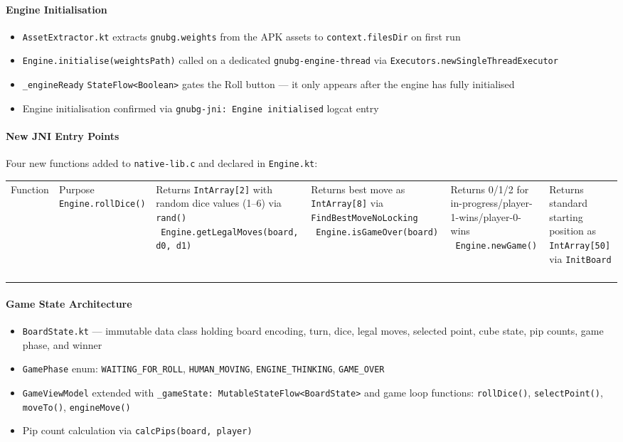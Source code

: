 \documentclass[11pt,a4paper]{article}
\providecommand{\tightlist}{\setlength{\itemsep}{2pt}\setlength{\parskip}{0pt}}
\begin{document}
\paragraph{Engine Initialisation}\label{engine-init-v093}

\begin{itemize}
\tightlist
\item
  \texttt{AssetExtractor.kt} extracts \texttt{gnubg.weights} from the
  APK assets to \texttt{context.filesDir} on first run
\item
  \texttt{Engine.initialise(weightsPath)} called on a dedicated
  \texttt{gnubg-engine-thread} via \texttt{Executors.newSingleThreadExecutor}
\item
  \texttt{\_engineReady} \texttt{StateFlow<Boolean>} gates the Roll
  button --- it only appears after the engine has fully initialised
\item
  Engine initialisation confirmed via \texttt{gnubg-jni: Engine
  initialised} logcat entry
\end{itemize}

\paragraph{New JNI Entry Points}\label{new-jni-v093}

Four new functions added to \texttt{native-lib.c} and declared in
\texttt{Engine.kt}:

\begin{longtable}[]{@{}ll@{}}
\toprule\noalign{}
Function & Purpose \
\midrule\noalign{}
\endhead
\bottomrule\noalign{}
\endlastfoot
\texttt{Engine.rollDice()} & Returns \texttt{IntArray[2]} with random dice values (1--6) via \texttt{rand()} \
\texttt{Engine.getLegalMoves(board, d0, d1)} & Returns best move as \texttt{IntArray[8]} via \texttt{FindBestMoveNoLocking} \
\texttt{Engine.isGameOver(board)} & Returns 0/1/2 for in-progress/player-1-wins/player-0-wins \
\texttt{Engine.newGame()} & Returns standard starting position as \texttt{IntArray[50]} via \texttt{InitBoard} \
\end{longtable}

\paragraph{Game State Architecture}\label{game-state-v093}

\begin{itemize}
\tightlist
\item
  \texttt{BoardState.kt} --- immutable data class holding board
  encoding, turn, dice, legal moves, selected point, cube state, pip
  counts, game phase, and winner
\item
  \texttt{GamePhase} enum: \texttt{WAITING\_FOR\_ROLL},
  \texttt{HUMAN\_MOVING}, \texttt{ENGINE\_THINKING},
  \texttt{GAME\_OVER}
\item
  \texttt{GameViewModel} extended with \texttt{\_gameState:
  MutableStateFlow<BoardState>} and game loop functions:
  \texttt{rollDice()}, \texttt{selectPoint()}, \texttt{moveTo()},
  \texttt{engineMove()}
\item
  Pip count calculation via \texttt{calcPips(board, player)}
\end{itemize}
\end{document}
